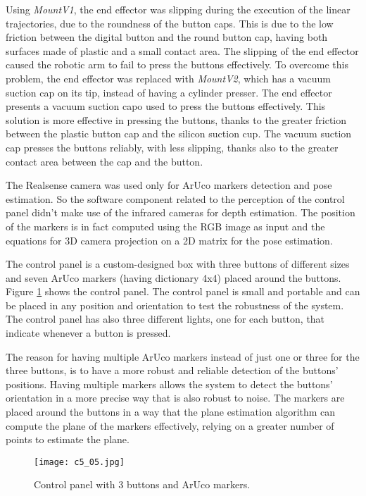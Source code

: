 Using \textit{MountV1}, the end effector was slipping during the execution of the linear trajectories, due to the
roundness of the button caps. This is due to the low friction between the digital button and the round button cap,
having both surfaces made of plastic and a small contact area. The slipping of the end effector caused the
robotic arm to fail to press the buttons effectively. To overcome this problem, the end effector was replaced
with \textit{MountV2}, which has a vacuum suction cap on its tip, instead of having a cylinder presser.
The end effector presents a vacuum suction capo used to press the buttons effectively.
This solution is more effective in pressing the buttons, thanks to the greater friction between the plastic
button cap and the silicon suction cup. The vacuum suction cap presses the buttons reliably, with less slipping,
thanks also to the greater contact area between the cap and the button.


The Realsense camera was used only for ArUco markers detection and pose estimation. So the software
component related to the perception of the control panel didn't make use of the infrared cameras for 
depth estimation. The position of the markers is in fact computed using the RGB image as input and
the equations for 3D camera projection on a 2D matrix for the pose estimation.

The control panel is a custom-designed box with three buttons of different sizes and seven ArUco markers
(having dictionary 4x4) placed around the buttons. Figure \ref{fig:buttonsbox} shows the control panel.
The control panel is small and portable and can be placed in any position and orientation to test the robustness
of the system. The control panel has also three different lights, one for each button,
that indicate whenever a button is pressed. 

The reason for having multiple ArUco markers instead of just one or three for the three buttons,
is to have a more robust and reliable detection of the buttons' positions. Having multiple markers
allows the system to detect the buttons' orientation in a more precise way that is also robust to noise.
The markers are placed around the buttons in a way that the plane estimation algorithm can compute
the plane of the markers effectively, relying on a greater number of points to estimate the plane.

\begin{figure}[t]
    \centering
    \texttt{[image: c5\_05.jpg]}
    \caption{Control panel with 3 buttons and ArUco markers.}
    \label{fig:buttonsbox}
\end{figure}


